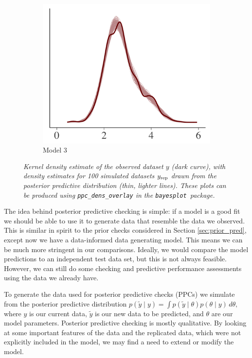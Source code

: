 \documentclass{statsoc}
\newcommand{\bayesplot}{{\tt bayesplot}}
\begin{document}
\begin{figure}
\begin{subfigure}{0.31\textwidth}
\includegraphics[width=\textwidth]{ppc_dens3.png}
\caption{Model 3}
\label{fig:ppc_dens3}
\end{subfigure}

\caption{\it Kernel density estimate of the observed dataset $y$ (dark curve),
with density estimates for 100 simulated datasets $y_{\rm rep}$ drawn
from the posterior predictive distribution (thin, lighter lines).
These plots can be produced using {\tt ppc\_dens\_overlay}
in the \bayesplot\ package.}
\label{fig:ppc_dens}
\end{figure}

The idea behind posterior predictive checking is simple: if a model is a good
fit  we should be able to use it to generate data that resemble the data we
observed. This is similar in spirit to the prior checks considered in Section
\ref{sec:prior_pred}, except now we have a data-informed data generating model.
This means we can be much more stringent in our comparisons. Ideally, we would
compare the model predictions to an independent test data set, but this is not
always feasible. However, we can still do some checking and predictive
performance assessments using the data we already have.

To generate the data used for posterior predictive checks (PPCs) we simulate
from the posterior predictive distribution $ p(\tilde{y} \mid y) = \int
p(\tilde{y} \mid \theta) p(\theta \mid y) \,d\theta, $ where $y$ is our current
data, $\tilde{y}$ is our new data to be predicted, and $\theta$ are our model
parameters. Posterior predictive checking is mostly qualitative. By looking at
some important features of the data and the replicated data, which were not
explicitly included in the model, we may find a need to extend or modify the
model.
\end{document}
